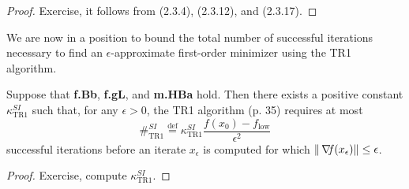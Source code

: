 \documentclass[10pt,a4paper]{article}
\begin{document}
\begin{proof}
	Exercise, it follows from (2.3.4), (2.3.12), and (2.3.17).
\end{proof}

We are now in a position to bound the total number of successful iterations necessary to find an $\epsilon$-approximate first-order minimizer using the TR1 algorithm.

\begin{lemma}
	Suppose that \textbf{f.Bb}, \textbf{f.gL}, and \textbf{m.HBa} hold. Then there exists a positive constant $\kappa_{\text{TR1}}^{SI}$ such that, for any $\epsilon > 0$, the TR1 algorithm (p. 35) requires at most
	\begin{equation*}
		\#_{\text{TR1}}^{SI} \stackrel{\text{def}}{=} \kappa_{\text{TR1}}^{SI} \frac{f(x_0) - f_{\text{low}}}{\epsilon^2}
	\end{equation*}
	successful iterations before an iterate $x_\epsilon$ is computed for which $\|\operatorname*{\mathit{\nabla \!f}}(x_\epsilon)\| \leq \epsilon$.
\end{lemma}
\begin{proof}
Exercise, compute $\kappa_{\text{TR1}}^{SI}$.
\end{proof}



\end{document}
